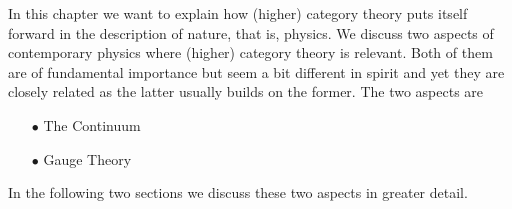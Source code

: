In this chapter we want to explain how (higher) category theory puts itself forward in the description of nature, that is, physics. We discuss two aspects of contemporary physics where (higher) category theory is relevant. Both of them are of fundamental importance but seem a bit different in spirit and yet they are closely related as the latter usually builds on the former. The two aspects are
\begin{enumerate}
\item[$\bullet$]
The Continuum
\item[$\bullet$]
Gauge Theory
\end{enumerate}
In the following two sections we discuss these two aspects in greater detail.
